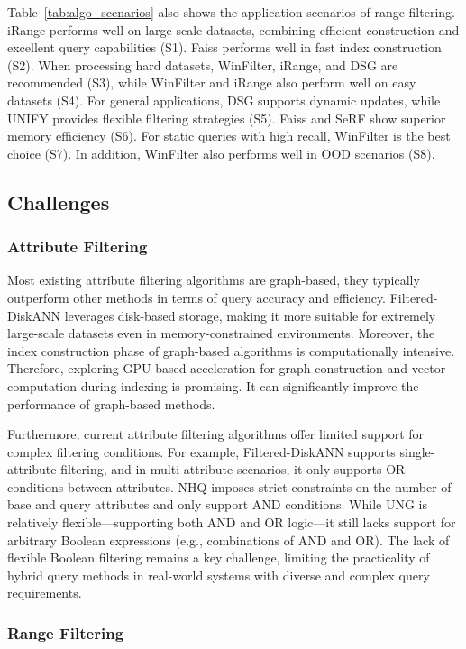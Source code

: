 \documentclass[sigconf, nonacm]{acmart}
\begin{document}
	Table~\ref{tab:algo_scenarios} also shows the application scenarios of range filtering. iRange performs well on large-scale datasets, combining efficient construction and excellent query capabilities (S1). Faiss performs well in fast index construction (S2). When processing hard datasets, WinFilter, iRange, and DSG are recommended (S3), while WinFilter and iRange also perform well on easy datasets (S4). For general applications, DSG supports dynamic updates, while UNIFY provides flexible filtering strategies (S5). Faiss and SeRF show superior memory efficiency (S6). For static queries with high recall, WinFilter is the best choice (S7). In addition, WinFilter also performs well in OOD scenarios (S8).
\subsection{Challenges}
\subsubsection{\textbf{Attribute Filtering}}
Most existing attribute filtering algorithms are graph-based, they typically outperform other methods in terms of query accuracy and efficiency. Filtered-DiskANN leverages disk-based storage, making it more suitable for extremely large-scale datasets even in memory-constrained environments. Moreover, the index construction phase of graph-based algorithms is computationally intensive. Therefore, exploring GPU-based acceleration for graph construction and vector computation during indexing is promising. It can significantly improve the performance of graph-based methods.

Furthermore, current attribute filtering algorithms offer limited support for complex filtering conditions. For example, Filtered-DiskANN  supports single-attribute filtering, and in multi-attribute scenarios, it only supports OR conditions between attributes. 
NHQ imposes strict constraints on the number of base and query attributes and only support AND conditions. While UNG is relatively flexible—supporting both AND and OR logic—it still lacks support for arbitrary Boolean expressions (e.g., combinations of AND and OR). The lack of flexible Boolean filtering remains a key challenge, limiting the practicality of hybrid query methods in real-world systems with diverse and complex query requirements.

\subsubsection{\textbf{Range Filtering}}
\end{document}

